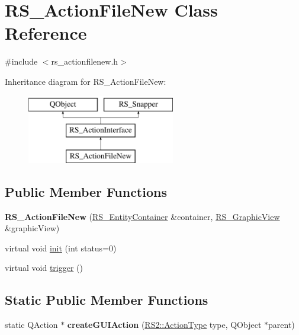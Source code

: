 \hypertarget{classRS__ActionFileNew}{\section{R\-S\-\_\-\-Action\-File\-New Class Reference}
\label{classRS__ActionFileNew}
}


{\ttfamily \#include $<$rs\-\_\-actionfilenew.\-h$>$}

Inheritance diagram for R\-S\-\_\-\-Action\-File\-New\-:\begin{figure}[H]
\begin{center}
\leavevmode
\includegraphics[height=3.000000cm]{classRS__ActionFileNew}
\end{center}
\end{figure}
\subsection*{Public Member Functions}
\begin{DoxyCompactItemize}
\item 
\hypertarget{classRS__ActionFileNew_a4a1048f76a6c21db24d2ac7bcdffe0c1}{{\bfseries R\-S\-\_\-\-Action\-File\-New} (\hyperlink{classRS__EntityContainer}{R\-S\-\_\-\-Entity\-Container} \&container, \hyperlink{classRS__GraphicView}{R\-S\-\_\-\-Graphic\-View} \&graphic\-View)}\label{classRS__ActionFileNew_a4a1048f76a6c21db24d2ac7bcdffe0c1}

\item 
virtual void \hyperlink{classRS__ActionFileNew_a45d1b9059dd64be1f51edab529655191}{init} (int status=0)
\item 
virtual void \hyperlink{classRS__ActionFileNew_a0d01781979de239b4d6c0c39d9be63af}{trigger} ()
\end{DoxyCompactItemize}
\subsection*{Static Public Member Functions}
\begin{DoxyCompactItemize}
\item 
\hypertarget{classRS__ActionFileNew_a91ad5068056fbb221393378d3f9a95c7}{static Q\-Action $\ast$ {\bfseries create\-G\-U\-I\-Action} (\hyperlink{classRS2_afe3523e0bc41fd637b892321cfc4b9d7}{R\-S2\-::\-Action\-Type} type, Q\-Object $\ast$parent)}\label{classRS__ActionFileNew_a91ad5068056fbb221393378d3f9a95c7}

\end{DoxyCompactItemize}
